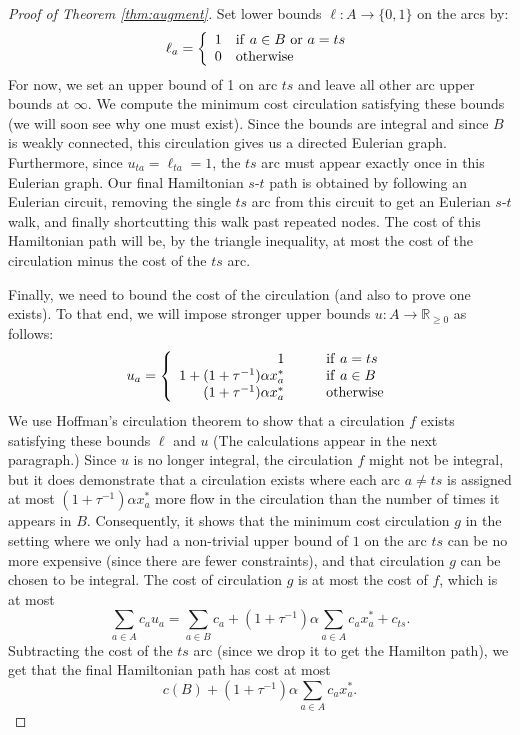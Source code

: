 \documentclass[11pt]{article}
\theoremstyle{definition}
\def\A{{B}}
\begin{document}
\begin{proof}[Proof of Theorem \ref{thm:augment}]
Set lower bounds $\ell : A \rightarrow \{0,1\}$ on the arcs by:
\[
\ell_a = \left\{
\begin{array}{rl}
1 & {\rm if~} a \in \A {\rm ~or~} a = ts \\
0 & {\rm otherwise}
\end{array}
\right.
\]
For now, we set an upper bound of 1 on arc $ts$ and leave all other arc
upper bounds at $\infty$. We compute the minimum cost circulation
satisfying these bounds (we will soon see why one must exist). Since the
bounds are integral and since $\A$ is weakly connected, this circulation
gives us a directed Eulerian graph. Furthermore, since $u_{ta} =
\ell_{ta} = 1$, the $ts$ arc must appear exactly once in this Eulerian
graph. Our final Hamiltonian $s$-$t$ path is obtained by following an
Eulerian circuit, removing the single $ts$ arc from this circuit to get
an Eulerian $s$-$t$ walk, and finally shortcutting this walk past
repeated nodes. The cost of this Hamiltonian path will be, by the
triangle inequality, at most the cost of the circulation minus the cost
of the $ts$ arc.

Finally, we need to bound the cost of the circulation (and also to prove
one exists). To that end, we will impose stronger upper bounds $u : A
\rightarrow \mathbb R_{\geq 0}$ as follows:
\[
u_a = \left\{
\begin{array}{rl}
1 & \qquad {\rm if~} a = ts \\
1 + (1+ \tau^{-1})\alpha x^*_a & \qquad {\rm if~} a \in \A \\
(1+\tau^{-1})\alpha x^*_a & \qquad {\rm otherwise}
\end{array}
\right.
\]
We use Hoffman's circulation theorem to show that a circulation $f$
exists satisfying these bounds $\ell$ and $u$ (The calculations appear
in the next paragraph.) Since $u$ is no longer integral, the circulation
$f$ might not be integral, but it does demonstrate that a circulation
exists where each arc $a \neq ts$ is assigned at most
$(1+\tau^{-1})\alpha x^*_a$ more flow in the circulation than the number
of times it appears in $\A$. Consequently, it shows that the minimum
cost circulation $g$ in the setting where we only had a non-trivial
upper bound of $1$ on the arc $ts$ can be no more expensive (since there
are fewer constraints), and that circulation $g$ can be chosen to be
integral. The cost of circulation $g$ is at most the cost of $f$, which
is at most
\[ \sum_{a \in A} c_a u_a = \sum_{a \in \A} c_a + (1+\tau^{-1})\alpha \sum_{a \in
  A} c_a x^*_a + c_{ts}. \] Subtracting the cost of the $ts$ arc (since
we drop it to get the Hamilton path),
we get that the final Hamiltonian path has cost at most
\[ c(\A) + (1+\tau^{-1}) \alpha \sum_{a \in
  A} c_a x^*_a. \]






\end{proof}
\end{document}
